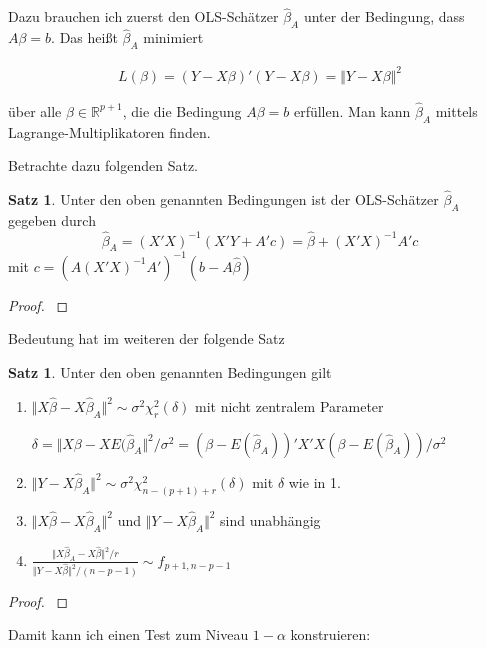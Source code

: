 \documentclass[12pt,a4paper]{article}
\theoremstyle{definition}
\theoremstyle{definition}
\newtheorem{Satz}[Definition]{Satz}
\theoremstyle{definition}
\begin{document}
Dazu brauchen ich zuerst den OLS-Schätzer $\hat{\beta}_A$ unter der Bedingung, dass $A \beta = b$. Das heißt $\hat{\beta}_A$ minimiert

\begin{align*}
L(\beta) = (Y-X\beta)'(Y-X\beta) = \Vert Y - X \beta \Vert^2
\end{align*}

über alle $\beta \in \mathbb{R}^{p+1}$, die die Bedingung $A\beta = b$ erfüllen. Man kann $\hat{\beta}_A$ mittels Lagrange-Multiplikatoren finden. 

Betrachte dazu folgenden Satz.

\begin{Satz}
Unter den oben genannten Bedingungen ist der OLS-Schätzer $\hat{\beta}_A$ gegeben durch 
\[
\hat{\beta}_A=(X'X)^{-1}(X'Y+A'c)= \hat{\beta}+(X'X)^{-1}A'c
\]
 mit $c=(A(X'X)^{-1}A')^{-1}(b-A\hat{\beta})$
\end{Satz}

\begin{proof}
\cite[13]{Liu64}
\end{proof}

Bedeutung hat im weiteren der folgende Satz

\begin{Satz}
Unter den oben genannten Bedingungen gilt
\begin{enumerate}
\item $\Vert X \hat{\beta} - X\hat{\beta}_A \Vert^2  \sim \sigma^2 \chi_r^2(\delta)$ mit nicht zentralem Parameter 

$\delta = \Vert X \beta - X E(\hat{\beta}_A \Vert^2 / \sigma^2 = (\beta - E(\hat{\beta}_A))' X'X (\beta - E(\hat{\beta}_A)) / \sigma^2$
\item $\Vert Y - X \hat{\beta}_A \Vert^2  \sim \sigma^2 \chi_{n-(p+1)+r}^2(\delta)$ mit $\delta$ wie in 1.
\item $\Vert X \hat{\beta} - X\hat{\beta}_A \Vert^2$ und $\Vert Y - X \hat{\beta}_A \Vert^2$ sind unabhängig
\item $ \frac{\Vert X \hat{\beta}_A - X\hat{\beta} \Vert^2 / r}{\Vert Y - X \hat{\beta} \Vert^2 / (n-p-1)} \sim f_{p+1,n-p-1}$
\end{enumerate}
\end{Satz}

\begin{proof}
\cite[11]{Liu64}
\end{proof}

Damit kann ich einen Test zum Niveau $1-\alpha$ konstruieren:
\end{document}
